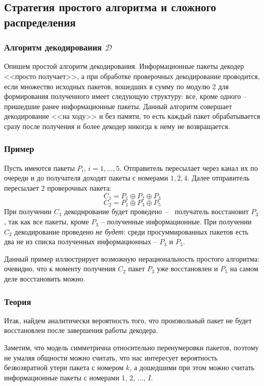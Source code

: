 \subsection{Стратегия простого алгоритма и сложного распределения}

\subsubsection{Алгоритм декодирования $\mathcal D$}

Опишем простой алгоритм декодирования. Информационные пакеты декодер
<<просто получает>>, а при обработке проверочных декодирование проводится, 
если множество исходных
пакетов, вошедших в сумму по модулю 2 для формирования полученного
имеет следующую структуру: все, кроме одного -- пришедшие ранее
информационные пакеты.
Данный алгоритм совершает декодирование <<на ходу>> и без памяти, 
то есть каждый
пакет обрабатывается сразу после получения и более декодер никогда
к нему не возвращается.

\subsubsection{Пример}

Пусть имеются пакеты $P_i$, $i=1,\dots, 5$. Отправитель пересылает
через канал их по очереди и до получателя доходят пакеты с номерами
$1, 2, 4$. Далее отправитель пересылает 2 проверочных пакета:
\[C_1 = P_1 \oplus P_2 \oplus P_3\]
\[C_2 = P_1 \oplus P_3 \oplus P_5\]
При получении $C_1$ декодирование будет проведено~--~
получатель восстановит $P_3$, так как все пакеты, кроме $P_3$
-- полученные информационные. При получении $C_2$ декодирование
проведено \emph{не будет}: среди просуммированных пакетов есть 
два не из списка полученных информационных -- $P_3$ и $P_5$. 

Данный пример иллюстрирует возможную нерациональность простого алгоритма:
очевидно, что к моменту получения $C_2$ пакет $P_3$ уже восстановлен
и $P_5$ на самом деле восстановить можно.

\subsubsection{Теория}

Итак, найдем аналитически вероятность того, что произвольный пакет
не будет восстановлен после завершения работы декодера.

Заметим, что модель симметрична относительно перенумеровки пакетов, поэтому
не умаляя общности можно считать, что нас интересует вероятность
безвозвратной утери пакета с номером $k$, а дошедшими при этом можно считать информационные
пакеты с номерами 1, 2, ..., $I$. 

